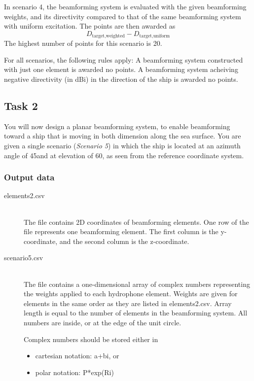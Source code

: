 \documentclass{article}
\begin{document}
In scenario 4, the beamforming system is evaluated with the given beamforming 
weights, and its directivity compared to that of the same beamforming system 
with uniform excitation. The points are then awarded as
\[ D_\textrm{target,weighted} - D_\textrm{target,uniform} \]
The highest number of points for this scenario is 20.

For all scenarios, the following rules apply: A beamforming system constructed 
with just one element is awarded no points. A beamforming system acheiving 
negative directivity (in dBi) in the direction of the ship is awarded no points.

\subsection*{Task 2}

You will now design a planar beamforming system, to enable beamforming toward a 
ship that is moving in both dimension along the sea surface. You are given a 
single scenario (\textit{Scenario 5}) in which the ship is located at an 
azimuth angle of 45\textdegree and at elevation of 60\textdegree, as seen from 
the reference coordinate system.

\subsubsection*{Output data}

\begin{description}
	\item[elements2.csv] \,\\ The file contains 2D coordinates of beamforming 
	elements. One row of the file represents one beamforming element. The first 
	column is the y-coordinate, and the second column is the z-coordinate.
	
	\item[scenario5.csv] \,\\ The file contains a one-dimensional array of 
	complex numbers representing the weights applied to each hydrophone 
	element. Weights are given for elements in the same order as they are 
	listed in \textsf{elements2.csv}. Array length is equal to the number of 
	elements in the beamforming system. All numbers are inside, or at the edge 
	of the unit circle.
	
	Complex numbers should be stored either in
	\begin{itemize}
		\item cartesian notation: \textsf{a+bi}, or
		\item polar notation: \textsf{P*exp(Ri)}
	\end{itemize}
\end{description}
\end{document}
